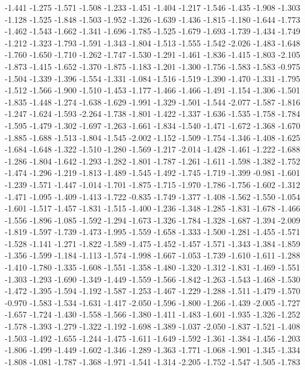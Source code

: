 \documentclass[9pt]{article}
\theoremstyle{plain}
\theoremstyle{definition}
\theoremstyle{remark}
\numberwithin{equation}{section}
\begin{document}
-1.441
-1.275
-1.571
-1.508
-1.233
-1.451
-1.404
-1.217
-1.546
-1.435
-1.908
-1.303
-1.128
-1.525
-1.848
-1.503
-1.952
-1.326
-1.639
-1.436
-1.815
-1.180
-1.644
-1.773
-1.462
-1.543
-1.662
-1.341
-1.696
-1.785
-1.525
-1.679
-1.693
-1.739
-1.434
-1.749
-1.212
-1.323
-1.793
-1.591
-1.343
-1.804
-1.513
-1.555
-1.542
-2.026
-1.483
-1.648
-1.760
-1.650
-1.710
-1.262
-1.747
-1.530
-1.291
-1.461
-1.836
-1.415
-1.803
-2.105
-1.873
-1.415
-1.652
-1.370
-1.875
-1.183
-1.201
-1.300
-1.756
-1.583
-1.583
-0.975
-1.504
-1.339
-1.396
-1.554
-1.331
-1.084
-1.516
-1.519
-1.390
-1.470
-1.331
-1.795
-1.512
-1.566
-1.900
-1.510
-1.453
-1.177
-1.466
-1.466
-1.491
-1.154
-1.306
-1.501
-1.835
-1.448
-1.274
-1.638
-1.629
-1.991
-1.329
-1.501
-1.544
-2.077
-1.587
-1.816
-1.247
-1.624
-1.593
-2.264
-1.738
-1.801
-1.422
-1.337
-1.636
-1.535
-1.758
-1.784
-1.595
-1.479
-1.302
-1.697
-1.263
-1.661
-1.834
-1.540
-1.471
-1.672
-1.368
-1.670
-1.885
-1.688
-1.513
-1.804
-1.545
-2.002
-1.152
-1.509
-1.754
-1.346
-1.408
-1.625
-1.684
-1.648
-1.322
-1.510
-1.280
-1.569
-1.217
-2.014
-1.428
-1.461
-1.222
-1.688
-1.286
-1.804
-1.642
-1.293
-1.282
-1.801
-1.787
-1.261
-1.611
-1.598
-1.382
-1.752
-1.474
-1.296
-1.219
-1.813
-1.489
-1.545
-1.492
-1.745
-1.719
-1.399
-0.981
-1.601
-1.239
-1.571
-1.447
-1.014
-1.701
-1.875
-1.715
-1.970
-1.786
-1.756
-1.602
-1.312
-1.471
-1.095
-1.409
-1.413
-1.722
-0.835
-1.749
-1.377
-1.408
-1.562
-1.550
-1.054
-1.601
-1.517
-1.457
-1.831
-1.515
-1.400
-1.236
-1.348
-1.285
-1.831
-1.678
-1.466
-1.556
-1.896
-1.085
-1.592
-1.294
-1.673
-1.326
-1.784
-1.328
-1.687
-1.394
-2.009
-1.819
-1.597
-1.739
-1.473
-1.995
-1.559
-1.658
-1.333
-1.500
-1.281
-1.455
-1.571
-1.528
-1.141
-1.271
-1.822
-1.589
-1.475
-1.452
-1.457
-1.571
-1.343
-1.384
-1.859
-1.356
-1.599
-1.184
-1.113
-1.574
-1.998
-1.667
-1.053
-1.739
-1.610
-1.611
-1.288
-1.410
-1.780
-1.335
-1.608
-1.551
-1.358
-1.480
-1.320
-1.312
-1.831
-1.469
-1.551
-1.303
-1.293
-1.690
-1.349
-1.449
-1.559
-1.566
-1.842
-1.263
-1.543
-1.468
-1.530
-1.472
-1.395
-1.594
-1.192
-1.587
-1.253
-1.467
-1.229
-1.288
-1.511
-1.479
-1.570
-0.970
-1.583
-1.534
-1.631
-1.417
-2.050
-1.596
-1.800
-1.266
-1.439
-2.005
-1.727
-1.657
-1.724
-1.430
-1.558
-1.566
-1.380
-1.411
-1.483
-1.601
-1.935
-1.326
-1.252
-1.578
-1.393
-1.279
-1.322
-1.192
-1.698
-1.389
-1.037
-2.050
-1.837
-1.521
-1.408
-1.503
-1.492
-1.655
-1.244
-1.475
-1.611
-1.649
-1.592
-1.361
-1.384
-1.456
-1.203
-1.806
-1.499
-1.449
-1.602
-1.346
-1.289
-1.363
-1.771
-1.068
-1.901
-1.345
-1.334
-1.808
-1.081
-1.787
-1.368
-1.971
-1.541
-1.314
-2.205
-1.752
-1.547
-1.505
-1.783
\end{document}
